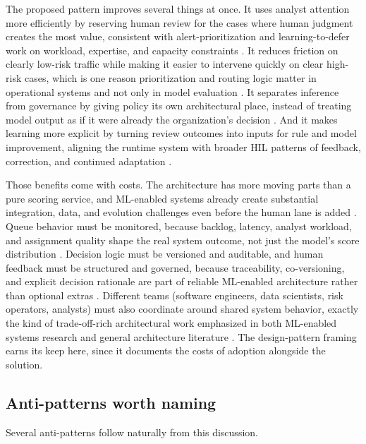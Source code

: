 \documentclass[11pt,a4paper]{article}
\begin{document}
The proposed pattern improves several things at once. It uses analyst attention more efficiently by reserving human review for the cases where human judgment creates the most value, consistent with alert-prioritization and learning-to-defer work on workload, expertise, and capacity constraints \citep{Jalalvand2024, Alves2025}. It reduces friction on clearly low-risk traffic while making it easier to intervene quickly on clear high-risk cases, which is one reason prioritization and routing logic matter in operational systems and not only in model evaluation \citep{Jalalvand2024, Kaestner2025}. It separates inference from governance by giving policy its own architectural place, instead of treating model output as if it were already the organization's decision \citep{Chen2022, Lewis2021Challenges}. And it makes learning more explicit by turning review outcomes into inputs for rule and model improvement, aligning the runtime system with broader HIL patterns of feedback, correction, and continued adaptation \citep{Andersen2024, MosqueiraRey2023}.

Those benefits come with costs. The architecture has more moving parts than a pure scoring service, and ML-enabled systems already create substantial integration, data, and evolution challenges even before the human lane is added \citep{Lewis2021Challenges, Nazir2024}. Queue behavior must be monitored, because backlog, latency, analyst workload, and assignment quality shape the real system outcome, not just the model's score distribution \citep{Jalalvand2024, Ghadermazi2024}. Decision logic must be versioned and auditable, and human feedback must be structured and governed, because traceability, co-versioning, and explicit decision rationale are part of reliable ML-enabled architecture rather than optional extras \citep{Lewis2021Challenges, Cruz2023}. Different teams (software engineers, data scientists, risk operators, analysts) must also coordinate around shared system behavior, exactly the kind of trade-off-rich architectural work emphasized in both ML-enabled systems research and general architecture literature \citep{Nazir2024, Richards2025}. The design-pattern framing earns its keep here, since it documents the costs of adoption alongside the solution.

\subsection{Anti-patterns worth naming}

Several anti-patterns follow naturally from this discussion.
\end{document}
